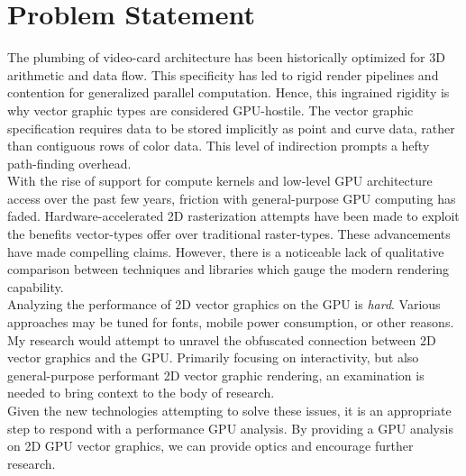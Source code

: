 \section{Problem Statement}

The plumbing of video-card architecture has been historically optimized for 3D arithmetic and data flow. This specificity has led to rigid render pipelines and contention for generalized parallel computation. Hence, this ingrained rigidity is why vector graphic types are considered GPU-hostile. The vector graphic specification requires data to be stored implicitly as point and curve data, rather than contiguous rows of color data. This level of indirection prompts a hefty path-finding overhead.\\

With the rise of support for compute kernels and low-level GPU architecture access over the past few years, friction with general-purpose GPU computing has faded. Hardware-accelerated 2D rasterization attempts have been made to exploit the benefits vector-types offer over traditional raster-types. These advancements have made compelling claims. However, there is a noticeable lack of qualitative comparison between techniques and libraries which gauge the modern rendering capability.\\

Analyzing the performance of 2D vector graphics on the GPU is \emph{hard}. Various approaches may be tuned for fonts, mobile power consumption, or other reasons. My research would attempt to unravel the obfuscated connection between 2D vector graphics and the GPU. Primarily focusing on interactivity, but also general-purpose performant 2D vector graphic rendering, an examination is needed to bring context to the body of research. \\

Given the new technologies attempting to solve these issues, it is an appropriate step to respond with a performance GPU analysis. By providing a GPU analysis on 2D GPU vector graphics, we can provide optics and encourage further research.
